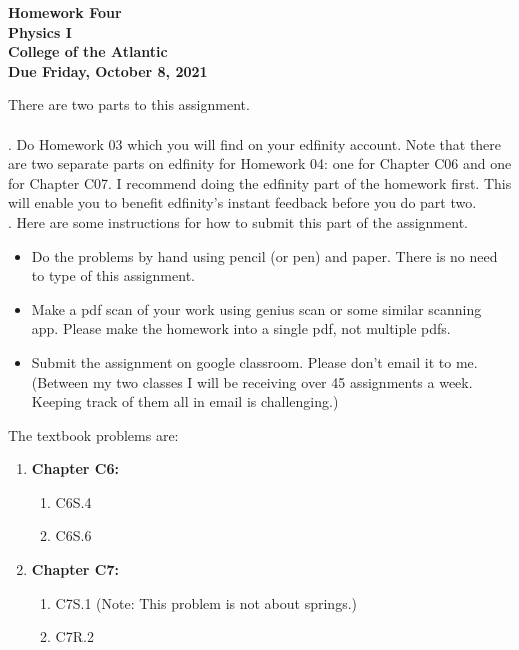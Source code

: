\documentclass[12pt]{article}
\begin{document}
\pagestyle{empty}
 
\begin{center}
{\LARGE {\bf Homework Four}}\\
\bigskip
{\Large {\bf Physics I}}\\
\bigskip
{\Large {\bf College of the Atlantic}}\\
\bigskip
{ {\bf Due Friday, October 8, 2021}}\\ 
\end{center}
\medskip

\noindent There are two parts to this assignment.\\

\hspace{2mm}\\

.  Do Homework 03 which you will find
on your edfinity account.  Note that there are two separate parts on
edfinity for Homework 04: one for Chapter C06 and one for Chapter
C07.  I recommend doing the edfinity part of the homework first.  This
will enable you to benefit edfinity's instant feedback before you do
part two.\\ 


.  Here are some
instructions for how to submit this part of the assignment.
\begin{itemize}
\item Do the problems by hand using pencil (or pen) and paper.
  There is no need to type of this assignment.
\item Make a pdf scan of your work using genius scan or some
  similar scanning app.  Please make the homework into a single
  pdf, not multiple pdfs.
\item Submit the assignment on google classroom.  Please don't
  email it to me.  (Between my two classes I will be receiving
  over 45 assignments a week.  Keeping track of them all in email
  is challenging.)\\
\end{itemize}

\noindent The textbook problems are:   

\begin{enumerate}
\setlength{\itemsep}{-1mm}
\item {\bf Chapter C6:}
  \begin{enumerate}
  \item C6S.4
  \item C6S.6
  \end{enumerate}

\item {\bf Chapter C7:}
  \begin{enumerate}
  \item C7S.1 (Note: This problem is not about springs.)
  \item C7R.2
  \end{enumerate}
\end{enumerate}
\end{document}
